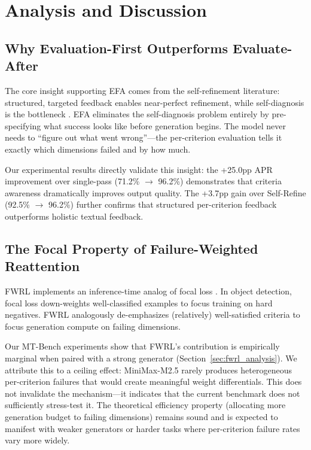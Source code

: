 \documentclass[11pt]{article}
\newcommand{\efa}{\textsc{EFA}}  %
\newcommand{\fwrl}{\textsc{FWRL}}
\begin{document}
\section{Analysis and Discussion}

\subsection{Why Evaluation-First Outperforms Evaluate-After}

The core insight supporting \efa{} comes from the self-refinement literature: structured, targeted feedback enables near-perfect refinement, while self-diagnosis is the bottleneck \citep{lee2025refinebench}. \efa{} eliminates the self-diagnosis problem entirely by pre-specifying what success looks like before generation begins. The model never needs to ``figure out what went wrong''---the per-criterion evaluation tells it exactly which dimensions failed and by how much.

Our experimental results directly validate this insight: the +25.0pp APR improvement over single-pass (71.2\% $\rightarrow$ 96.2\%) demonstrates that criteria awareness dramatically improves output quality. The +3.7pp gain over Self-Refine (92.5\% $\rightarrow$ 96.2\%) further confirms that structured per-criterion feedback outperforms holistic textual feedback.

\subsection{The Focal Property of Failure-Weighted Reattention}

\fwrl{} implements an inference-time analog of focal loss \citep{lin2017focal}. In object detection, focal loss down-weights well-classified examples to focus training on hard negatives. \fwrl{} analogously de-emphasizes (relatively) well-satisfied criteria to focus generation compute on failing dimensions.

Our MT-Bench experiments show that \fwrl{}'s contribution is empirically marginal when paired with a strong generator (Section~\ref{sec:fwrl_analysis}). We attribute this to a ceiling effect: MiniMax-M2.5 rarely produces heterogeneous per-criterion failures that would create meaningful weight differentials. This does not invalidate the mechanism---it indicates that the current benchmark does not sufficiently stress-test it. The theoretical efficiency property (allocating more generation budget to failing dimensions) remains sound and is expected to manifest with weaker generators or harder tasks where per-criterion failure rates vary more widely.
\end{document}
